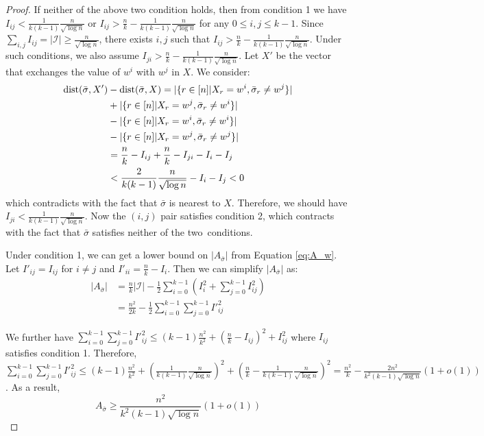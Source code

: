 \documentclass[entropy,article,accept,moreauthors,pdftex]{Definitions/mdpi}
\newcommand{\cI}{\mathcal{I}}
\newcommand{\1}{\mathbbm{1}}
\DeclareMathOperator{\Dist}{dist}
\begin{document}
\begin{paracol}{2}
\begin{proof}
	If neither of the above two condition holds, then from condition 1 we have\linebreak
	$I_{ij} < \frac{1}{k(k-1)}\frac{n}{\sqrt{\log n}}$ or $I_{ij} > \frac{n}{k} - \frac{1}{k(k-1)}\frac{n}{\sqrt{\log n}}$ for any $0 \leq i,j\leq k-1$.
	Since\linebreak $\sum_{i,j} I_{ij} = |\cI| \geq \frac{n}{\sqrt{\log n}}$, there exists $i,j$ such that $I_{ij} > \frac{n}{k} - \frac{1}{k(k-1)}\frac{n}{\sqrt{\log n}}$.
	Under such conditions, we also assume $I_{ji} > \frac{n}{k} - \frac{1}{k(k-1)}\frac{n}{\sqrt{\log n}}$.
	Let $X'$ be the vector that exchanges the value of $w^i$ with $w^j$ in $X$. We consider:
\begin{align}
	 \Dist(\bar{\sigma}, X') & - \Dist(\bar{\sigma}, X)= |\{ r \in [n]|X_r=w^i, \bar{\sigma}_r \neq w^j \}| \notag\\
	&+ |\{ r \in [n]|X_r=w^j, \bar{\sigma}_r \neq w^i \}| \notag\\
	&-|\{ r \in [n]|X_r=w^i, \bar{\sigma}_r \neq w^i \}| \notag\\
	&- |\{ r \in [n]|X_r=w^j, \bar{\sigma}_r \neq w^j \}| \notag\\
	& = \frac{n}{k} - I_{ij} +  \frac{n}{k} - I_{ji} - I_i - I_j\label{eq:distsmall} \\
	& < \frac{2}{k(k-1)}\frac{n}{\sqrt{\log n}} - I_i - I_j < 0\notag
	\end{align}
	which contradicts with the fact that $\bar{\sigma}$ is nearest to $X$.
	Therefore, we should have $I_{ji} < \frac{1}{k(k-1)}\frac{n}{\sqrt{\log n}}$.
	Now the $(i, j)$ pair satisfies condition 2, which contracts with the fact that $\bar{\sigma}$ satisfies neither of the two~conditions.
	
	Under condition 1, we can get a lower bound on $|A_{\bar{\sigma}}|$ from Equation \eqref{eq:A_w}. Let $I'_{ij} = I_{ij}$ for $i\neq j$ and
	$I'_{ii} = \frac{n}{k} - I_i$. Then we can simplify $|A_{\bar{\sigma}}|$ as:
	\begin{align*}
	|A_{\bar{\sigma}}| &= \frac{n}{k}|\cI| - \frac{1}{2}\sum_{i=0}^{k-1}  (I^2_i + \sum_{j=0}^{k-1} I^2_{ij}) \\
	&= \frac{n^2}{2k} - \frac{1}{2} \sum_{i=0}^{k-1} \sum_{j=0}^{k-1} I'^2_{ij}
	\end{align*}
	
	We further have $\sum_{i=0}^{k-1} \sum_{j=0}^{k-1} I'^2_{ij} \leq (k-1)\frac{n^2}{k^2} + (\frac{n}{k} - I_{ij})^2 + I^2_{ij}$ where
	$I_{ij}$ satisfies condition 1. Therefore, $\sum_{i=0}^{k-1} \sum_{j=0}^{k-1} I'^2_{ij} \leq (k-1)\frac{n^2}{k^2} + (\frac{1}{k(k-1)}\frac{n}{\sqrt{\log n}})^2
	+ (\frac{n}{k} - \frac{1}{k(k-1)}\frac{n}{\sqrt{\log n}})^2 = \frac{n^2}{k} - \frac{2n^2}{k^2 (k-1)\sqrt{\log n}}(1+o(1))$.
	As a result,
\begin{equation}\label{eq:Asigma}
	A_{\bar{\sigma}} \geq \frac{n^2}{k^2 (k-1)\sqrt{\log n}}(1+o(1))
	\end{equation}
	

\end{proof}
\end{paracol}
\end{document}
